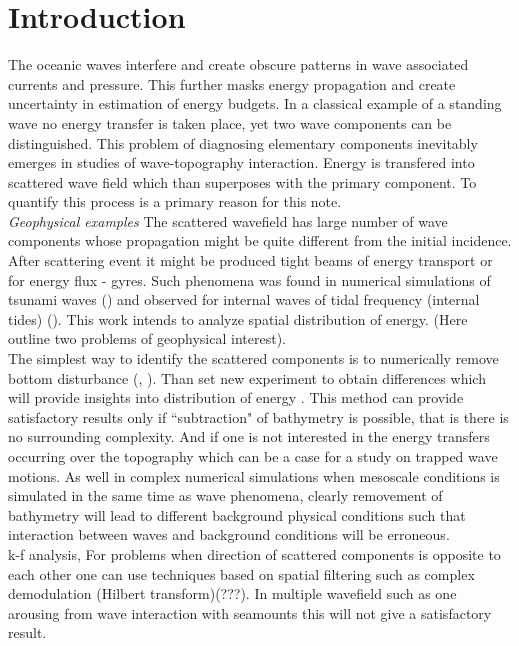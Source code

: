 \section{Introduction}
The oceanic waves interfere and create obscure patterns in wave associated currents and pressure. This further masks energy propagation and create uncertainty in estimation of energy budgets. In a classical example of a standing wave no energy transfer is taken place, yet two wave components can be distinguished. This problem of diagnosing elementary components  inevitably emerges in studies of wave-topography interaction. Energy is transfered into scattered wave field which than superposes with the primary component. To quantify this process is a primary reason for this note.\\
\textit{Geophysical examples}
The scattered wavefield has large number of wave components whose propagation might be quite different from the initial incidence. After scattering event it might be produced tight beams of energy transport or for energy flux - gyres. Such phenomena was found in numerical simulations  of tsunami waves (\cite{tang2012direct}) and observed for internal waves of tidal frequency (internal tides) (\cite{zhao2016global}). This work intends to analyze spatial distribution of energy. (Here outline two problems of geophysical interest).\\
The simplest way to identify the scattered components is to numerically remove bottom disturbance (\cite{kowalik2008kuril}, \cite{klymak2016reflection}). Than set new experiment to obtain differences which will provide insights into distribution of energy . This method can provide satisfactory results only if ``subtraction" of bathymetry is possible, that is there is no surrounding complexity. And if one is not interested in the energy transfers occurring over the topography which can be a case for a study on trapped wave motions. As well in complex numerical simulations when mesoscale conditions is simulated in the same time as wave phenomena, clearly removement of bathymetry will lead to different background physical conditions such that interaction between waves and background conditions will be erroneous.\\
k-f analysis, For problems when direction of scattered components is opposite to each other one can use techniques based on spatial filtering such as complex demodulation (Hilbert transform)\cite{mercier2008reflection}(???). In multiple wavefield such as one arousing from wave interaction with seamounts this will not give a satisfactory result.\\
